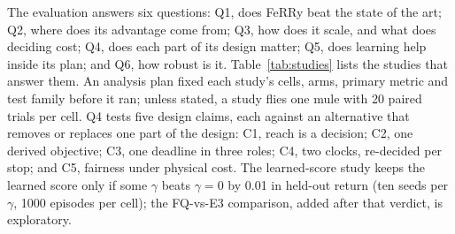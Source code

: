 \documentclass[conference]{IEEEtran}
\newcommand{\sysname}{FeRRy}
\begin{document}
The evaluation answers six questions: Q1, does \sysname{} beat the state of the
art; Q2, where does its advantage come from; Q3, how does it scale, and what does
deciding cost; Q4, does each part of its design matter; Q5, does learning help
inside its plan; and Q6, how robust is it. Table~\ref{tab:studies} lists the
studies that answer them. An analysis plan fixed each study's cells, arms,
primary metric and test family before it ran; unless stated, a study flies one
mule with 20 paired trials per cell. Q4 tests five design claims, each against an
alternative that removes or replaces one part of the design: C1, reach is a
decision; C2, one derived objective; C3, one deadline in three roles; C4, two
clocks, re-decided per stop; and C5, fairness under physical cost. The
learned-score study keeps the learned score only if some $\gamma$ beats
$\gamma=0$ by 0.01 in held-out return (ten seeds per $\gamma$, 1000 episodes per
cell); the FQ-vs-E3 comparison, added after that verdict, is exploratory.
\end{document}
